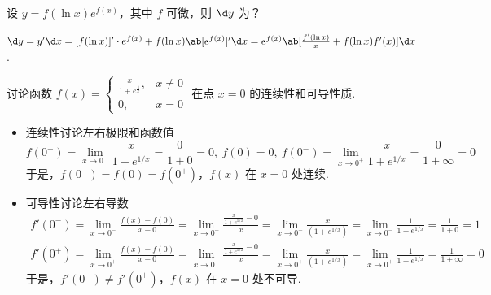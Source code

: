 \begin{problem}[本题5分]
  设 $y = f(\ln x)e^{f(x)}$，其中 $f$ 可微，则 $\d y$ 为？
\end{problem}
\scratch[8ex]
\begin{solution}
  $
     \d y = y'\d x = [f(\ln x)]' \cdot e^{f(x)} + f(\ln x)\ab[e^{f(x)}]'\d x
          = e^{f(x)} \ab[\frac{f'(\ln x)}{x} + f(\ln x)f'(x)] \d x  
  $.
\end{solution}

\begin{problem}[本题6分]
  讨论函数 $f(x) =
  \begin{cases}
    \frac{x}{1 + e^{\frac1x}}, & x\neq 0\\
    0,                         & x = 0
  \end{cases}$ 在点 $x = 0$ 的连续性和可导性质.
\end{problem}
\scratch[28ex]
\begin{solution}\leavevmode
  \begin{itemize}
    \item 连续性讨论左右极限和函数值
    \[
      f(0^-) = \lim_{x \to 0^-}\frac{x}{1 + e^{1/x}} = \frac{0}{1 + 0} = 0,~
      f(0) = 0,~
      f(0^-) = \lim_{x \to 0^+}\frac{x}{1 + e^{1/x}} = \frac{0}{1 + \infty} = 0
    \]
    于是，$f(0^-) = f(0) = f(0^+)$，$f(x)$ 在 $x = 0$ 处连续.
    \item 可导性讨论左右导数
    \begin{gather*}
      f'(0^-) = \lim_{x \to 0^-} \frac{f(x) - f(0)}{x - 0}
              = \lim_{x \to 0^-} \frac{\frac{x}{1 + e^{1/x}} - 0}{x}
              = \lim_{x \to 0^-} \frac{x}{(1 + e^{1/x})}
              = \lim_{x \to 0^-} \frac{1}{1 + e^{1/x}} = \frac{1}{1 + 0} = 1\\
      f'(0^+) = \lim_{x \to 0^+} \frac{f(x) - f(0)}{x-0}
              = \lim_{x \to 0^+} \frac{\frac{x}{1 + e^{1/x}} - 0}{x}
              = \lim_{x \to 0^+} \frac{x}{(1 + e^{1/x})}
              = \lim_{x \to 0^+} \frac{1}{1 + e^{1/x}}
              = \frac{1}{1 + \infty} = 0
    \end{gather*}
    于是，$f'(0^-) \neq f'(0^+)$，$f(x)$ 在 $x = 0$ 处不可导.
  \end{itemize}
\end{solution}